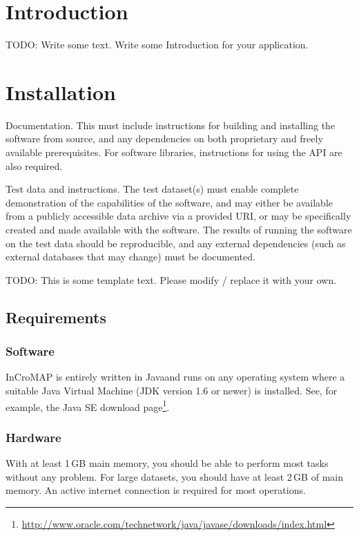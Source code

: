 \chapter{Introduction}

TODO: Write some text. Write some Introduction for your application.


\chapter{Installation}

Documentation. This must include instructions for building and installing the
software from source, and any dependencies on both proprietary and freely
available prerequisites. For software libraries, instructions for using the API
are also required.

Test data and instructions. The test dataset(s) must enable complete
demonstration of the capabilities of the software, and may either be available
from a publicly accessible data archive via a provided URI, or may be
specifically created and made available with the software. The results of
running the software on the test data should be reproducible, and any external
dependencies (such as external databases that may change) must be documented.

TODO: This is some template text. Please modify / replace it with your own.


\section{Requirements}
\subsection{Software}

InCroMAP is entirely written in Java\TTra and runs on any operating system
where a suitable Java Virtual Machine (JDK version 1.6 or newer) is installed.
See, for example, the Java SE download
page\footnote{\url{http://www.oracle.com/technetwork/java/javase/downloads/index.html}\label{fn:jvmldl}}.

\subsection{Hardware}

With at least 1\,GB main memory, you should be able to perform most tasks
without any problem. For large datasets, you should have at least 2\,GB of main
memory. \newline An active internet connection is required for most operations.


